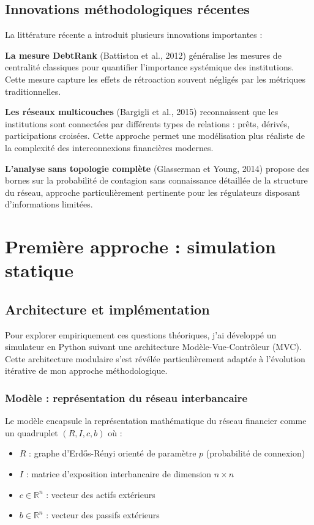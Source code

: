 \documentclass[12pt,a4paper,twoside]{article}
\begin{document}
\subsection{Innovations méthodologiques récentes}

La littérature récente a introduit plusieurs innovations importantes :

\textbf{La mesure DebtRank} (Battiston et al., 2012) généralise les mesures de centralité classiques pour quantifier l'importance systémique des institutions. Cette mesure capture les effets de rétroaction souvent négligés par les métriques traditionnelles.

\textbf{Les réseaux multicouches} (Bargigli et al., 2015) reconnaissent que les institutions sont connectées par différents types de relations : prêts, dérivés, participations croisées. Cette approche permet une modélisation plus réaliste de la complexité des interconnexions financières modernes.

\textbf{L'analyse sans topologie complète} (Glasserman et Young, 2014) propose des bornes sur la probabilité de contagion sans connaissance détaillée de la structure du réseau, approche particulièrement pertinente pour les régulateurs disposant d'informations limitées.

\section{Première approche : simulation statique}

\subsection{Architecture et implémentation}

Pour explorer empiriquement ces questions théoriques, j'ai développé un simulateur en Python suivant une architecture Modèle-Vue-Contrôleur (MVC). Cette architecture modulaire s'est révélée particulièrement adaptée à l'évolution itérative de mon approche méthodologique.

\subsubsection{Modèle : représentation du réseau interbancaire}

Le modèle encapsule la représentation mathématique du réseau financier comme un quadruplet $(R, I, c, b)$ où :
\begin{itemize}
\item $R$ : graphe d'Erdős-Rényi orienté de paramètre $p$ (probabilité de connexion)
\item $I$ : matrice d'exposition interbancaire de dimension $n \times n$
\item $c \in \mathbb{R}^n$ : vecteur des actifs extérieurs
\item $b \in \mathbb{R}^n$ : vecteur des passifs extérieurs
\end{itemize}
\end{document}
